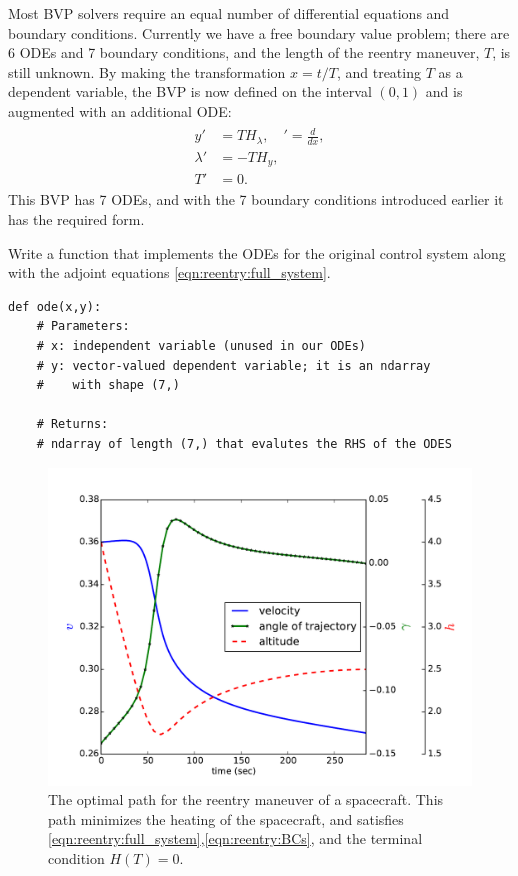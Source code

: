 Most BVP solvers require an equal number of differential equations and boundary conditions. 
Currently we have a free boundary value problem; there are 6 ODEs and 7 boundary conditions, and the length of the reentry maneuver, $T$, is still unknown. 
By making the transformation $x = t/T$, and treating $T$ as a dependent variable, the BVP is now defined on the interval $(0,1)$ and is augmented with an additional ODE: 
\begin{align}
\begin{split}
	y' &= TH_{\lambda},\quad ' = \frac{d}{dx},\\
	\lambda' &= -TH_{y},\\
	T' &= 0. \label{eqn:reentry:full_system}
\end{split}	
\end{align}
This BVP has 7 ODEs, and with the 7 boundary conditions introduced earlier it has the required form.

\begin{problem}
	Write a function  that implements the ODEs for the original control system along with the adjoint equations \eqref{eqn:reentry:full_system}. 
\begin{lstlisting}
def ode(x,y):
	# Parameters:
	# x: independent variable (unused in our ODEs)
	# y: vector-valued dependent variable; it is an ndarray 
	# 	 with shape (7,)
	
	# Returns: 
	# ndarray of length (7,) that evalutes the RHS of the ODES
\end{lstlisting}
\end{problem}

\begin{figure}
\centering
\includegraphics[width=\textwidth]{solutions.pdf}
\caption{The optimal path for the reentry maneuver of a spacecraft. This path minimizes the heating of the spacecraft, and satisfies  \eqref{eqn:reentry:full_system},\eqref{eqn:reentry:BCs}, and the terminal condition $H(T) = 0$.
}
\label{fig:reentry:solutions}
\end{figure}


